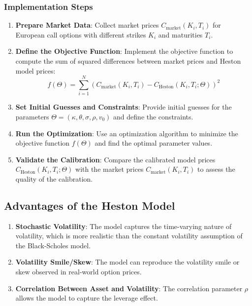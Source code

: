 \documentclass[11pt, oneside, a4paper, titlepage]{report}
\begin{document}
\subsubsection{Implementation Steps}

\begin{enumerate}
    \item \textbf{Prepare Market Data}:
    Collect market prices \( C_{\text{market}}(K_i, T_i) \) for European call options with different strikes \( K_i \) and maturities \( T_i \).
    \item \textbf{Define the Objective Function}:
    Implement the objective function to compute the sum of squared differences between market prices and Heston model prices:
    \[
    f(\Theta) = \sum_{i=1}^N \left( C_{\text{market}}(K_i, T_i) - C_{\text{Heston}}(K_i, T_i; \Theta) \right)^2
    \]
    \item \textbf{Set Initial Guesses and Constraints}:
    Provide initial guesses for the parameters \( \Theta = (\kappa, \theta, \sigma, \rho, v_0) \) and define the constraints.
    \item \textbf{Run the Optimization}:
    Use an optimization algorithm to minimize the objective function \( f(\Theta) \) and find the optimal parameter values.
    \item \textbf{Validate the Calibration}:
    Compare the calibrated model prices \( C_{\text{Heston}}(K_i, T_i; \Theta) \) with the market prices \( C_{\text{market}}(K_i, T_i) \) to assess the quality of the calibration.
\end{enumerate}

\subsection{Advantages of the Heston Model}

\begin{enumerate}
    \item \textbf{Stochastic Volatility}: The model captures the time-varying nature of volatility, which is more realistic than the constant volatility assumption of the Black-Scholes model.
    \item \textbf{Volatility Smile/Skew}: The model can reproduce the volatility smile or skew observed in real-world option prices.
    \item \textbf{Correlation Between Asset and Volatility}: The correlation parameter \( \rho \) allows the model to capture the leverage effect.
\end{enumerate}
\end{document}
